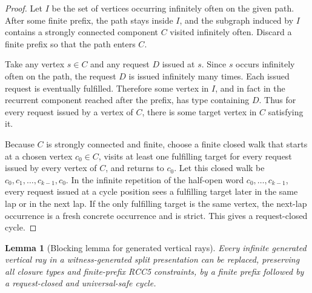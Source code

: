 \documentclass[11pt]{article}
\newtheorem{lemma}[theorem]{Lemma}
\begin{document}
\begin{proof}
Let $I$ be the set of vertices occurring infinitely often on the given path.  After some finite prefix, the path stays inside $I$, and the subgraph induced by $I$ contains a strongly connected component $C$ visited infinitely often.  Discard a finite prefix so that the path enters $C$.

Take any vertex $s\in C$ and any request $D$ issued at $s$.  Since $s$ occurs infinitely often on the path, the request $D$ is issued infinitely many times.  Each issued request is eventually fulfilled.  Therefore some vertex in $I$, and in fact in the recurrent component reached after the prefix, has type containing $D$.  Thus for every request issued by a vertex of $C$, there is some target vertex in $C$ satisfying it.

Because $C$ is strongly connected and finite, choose a finite closed walk that starts at a chosen vertex $c_0\in C$, visits at least one fulfilling target for every request issued by every vertex of $C$, and returns to $c_0$.  Let this closed walk be $c_0,c_1,\ldots,c_{k-1},c_0$.  In the infinite repetition of the half-open word $c_0,\ldots,c_{k-1}$, every request issued at a cycle position sees a fulfilling target later in the same lap or in the next lap.  If the only fulfilling target is the same vertex, the next-lap occurrence is a fresh concrete occurrence and is strict.  This gives a request-closed cycle.
\end{proof}

\begin{lemma}[Blocking lemma for generated vertical rays]\label{lem:blocking}
Every infinite generated vertical ray in a witness-generated split presentation can be replaced, preserving all closure types and finite-prefix RCC5 constraints, by a finite prefix followed by a request-closed and universal-safe cycle.
\end{lemma}
\end{document}
